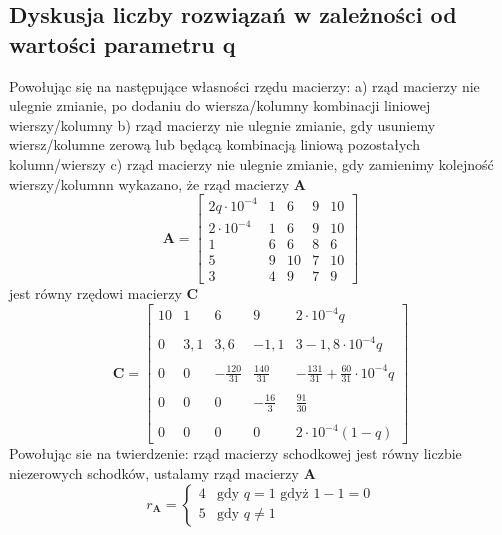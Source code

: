 \documentclass[a4paper]{article}
\begin{document}
\subsection{Dyskusja liczby rozwiązań w zależności od wartości parametru q}
Powołując się na następujące własności rzędu macierzy:\newline
a) rząd macierzy nie ulegnie zmianie, po dodaniu do wiersza/kolumny kombinacji liniowej wierszy/kolumny \newline
b) rząd macierzy nie ulegnie zmianie, gdy usuniemy wiersz/kolumne zerową lub będącą kombinacją liniową pozostałych kolumn/wierszy\newline
c) rząd macierzy nie ulegnie zmianie, gdy zamienimy kolejność wierszy/kolumnn \newline \newline
wykazano, że rząd macierzy \textbf{A} \newline
\begin {displaymath}
\mathbf{A} =
\left[
\begin{array}{ccccc}
2q\cdot 10^{-4}&1&6&9&10\\
2\cdot 10^{-4}&1&6&9&10\\
1&6&6&8&6\\
5&9&10&7&10\\
3&4&9&7&9
\end{array}
\right]
\end{displaymath}
jest równy rzędowi macierzy \textbf{C} \newline
\begin{displaymath}
\mathbf{C} =
\left[
\begin{array}{ccccc}
10&1&6&9&2\cdot 10^{-4}q\\ \\
0&3,1&3,6&-1,1&3-1,8\cdot 10^{-4}q\\ \\
0&0&-\frac{120}{31}&\frac{140}{31}&-\frac{131}{31}+\frac{60}{31}\cdot 10^{-4}q\\ \\
0&0&0&-\frac{16}{3}&\frac{91}{30}\\ \\
0&0&0&0&2\cdot 10^{-4}(1-q)
\end{array}
\right]
\end{displaymath}
\newline
Powołując sie na twierdzenie: rząd macierzy schodkowej jest równy liczbie niezerowych schodków, ustalamy rząd macierzy \textbf{A}
\newline
$$
r_{\mathbf{A}} =
\left\{
\begin{array}{ll}
4&\textrm{gdy $q=1$ gdyż $1-1=0$}\\
5&\textrm{gdy $q \neq 1$}
\end{array}
\right.
$$
\end{document}
